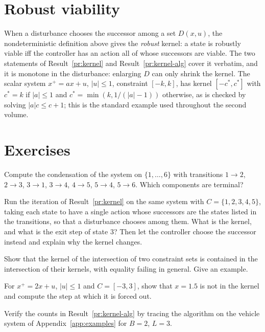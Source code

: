 \section{Robust viability}

When a disturbance chooses the successor among a set $D(x,u)$, the nondeterministic definition above gives the \emph{robust} kernel: a state is robustly viable iff the controller has an action all of whose successors are viable. The two statements of Result~\ref{pr:kernel} and Result~\ref{pr:kernel-alg} cover it verbatim, and it is monotone in the disturbance: enlarging $D$ can only shrink the kernel. The scalar system $x^+=ax+u$, $|u|\le1$, constraint $[-k,k]$, has kernel $[-c^*,c^*]$ with $c^*=k$ if $|a|\le1$ and $c^*=\min(k,1/(|a|-1))$ otherwise, as is checked by solving $|a|c\le c+1$; this is the standard example used throughout the second volume.

\section*{Exercises}

\begin{exercise}
Compute the condensation of the system on $\{1,\dots,6\}$ with transitions $1\to2$, $2\to3$, $3\to1$, $3\to4$, $4\to5$, $5\to4$, $5\to6$. Which components are terminal?
\end{exercise}

\begin{exercise}
Run the iteration of Result~\ref{pr:kernel} on the same system with $C=\{1,2,3,4,5\}$, taking each state to have a single action whose successors are the states listed in the transitions, so that a disturbance chooses among them. What is the kernel, and what is the exit step of state $3$? Then let the controller choose the successor instead and explain why the kernel changes.
\end{exercise}

\begin{exercise}
Show that the kernel of the intersection of two constraint sets is contained in the intersection of their kernels, with equality failing in general. Give an example.
\end{exercise}

\begin{exercise}
For $x^+=2x+u$, $|u|\le1$ and $C=[-3,3]$, show that $x=1.5$ is not in the kernel and compute the step at which it is forced out.
\end{exercise}

\begin{exercise}
Verify the counts in Result~\ref{pr:kernel-alg} by tracing the algorithm on the vehicle system of Appendix~\ref{app:examples} for $B=2$, $L=3$.
\end{exercise}
